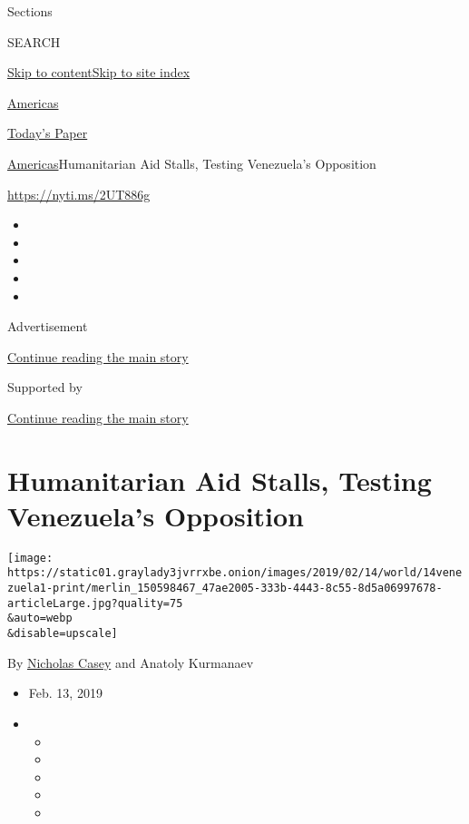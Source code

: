 Sections

SEARCH

\protect\hyperlink{site-content}{Skip to
content}\protect\hyperlink{site-index}{Skip to site index}

\href{https://www.nytimes3xbfgragh.onion/section/world/americas}{Americas}

\href{https://myaccount.nytimes3xbfgragh.onion/auth/login?response_type=cookie\&client_id=vi}{}

\href{https://www.nytimes3xbfgragh.onion/section/todayspaper}{Today's
Paper}

\href{/section/world/americas}{Americas}\textbar{}Humanitarian Aid
Stalls, Testing Venezuela's Opposition

\url{https://nyti.ms/2UT886g}

\begin{itemize}
\item
\item
\item
\item
\item
\end{itemize}

Advertisement

\protect\hyperlink{after-top}{Continue reading the main story}

Supported by

\protect\hyperlink{after-sponsor}{Continue reading the main story}

\hypertarget{humanitarian-aid-stalls-testing-venezuelas-opposition}{%
\section{Humanitarian Aid Stalls, Testing Venezuela's
Opposition}\label{humanitarian-aid-stalls-testing-venezuelas-opposition}}

\texttt{[image: https://static01.graylady3jvrrxbe.onion/images/2019/02/14/world/14venezuela1-print/merlin\_150598467\_47ae2005-333b-4443-8c55-8d5a06997678-articleLarge.jpg?quality=75\\\&auto=webp\\\&disable=upscale]}

By \href{https://www.nytimes3xbfgragh.onion/by/nicholas-casey}{Nicholas
Casey} and Anatoly Kurmanaev

\begin{itemize}
\item
  Feb. 13, 2019
\item
  \begin{itemize}
  \item
  \item
  \item
  \item
  \item
  \end{itemize}
\end{itemize}

